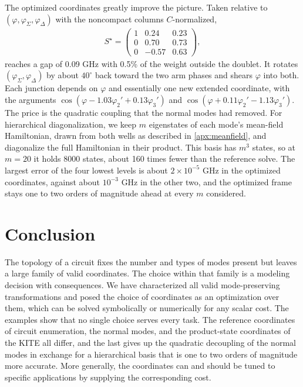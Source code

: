 The optimized coordinates greatly improve the picture.
Taken relative to $(\varphi,\varphi_\Sigma,\varphi_\Delta)$ with the noncompact columns $C$-normalized,
\begin{align}
S^\star=\begin{pmatrix}1&0.24&0.23\\0&0.70&0.73\\0&-0.57&0.63\end{pmatrix},
\label{eq:kite_S_opt}
\end{align}
reaches a gap of 0.09 GHz with 0.5\% of the weight outside the doublet.
It rotates $(\varphi_\Sigma,\varphi_\Delta)$ by about $40^\circ$ back toward the two arm phases and shears $\varphi$ into both.
Each junction depends on $\varphi$ and essentially one new extended coordinate, with the arguments $\cos(\varphi-1.03\varphi_2'+0.13\varphi_3')$ and $\cos(\varphi+0.11\varphi_2'-1.13\varphi_3')$.
The price is the quadratic coupling that the normal modes had removed.
For hierarchical diagonalization, we keep $m$ eigenstates of each mode's mean-field Hamiltonian, drawn from both wells as described in \cref{apx:meanfield}, and diagonalize the full Hamiltonian in their product.
This basis has $m^3$ states, so at $m=20$ it holds 8000 states, about 160 times fewer than the reference solve.
The largest error of the four lowest levels is about $2\times10^{-5}$ GHz in the optimized coordinates, against about $10^{-3}$ GHz in the other two, and the optimized frame stays one to two orders of magnitude ahead at every $m$ considered.

\section{Conclusion}\label{sec:conc}

The topology of a circuit fixes the number and types of modes present but leaves a large family of valid coordinates.
The choice within that family is a modeling decision with consequences.
We have characterized all valid mode-preserving transformations and posed the choice of coordinates as an optimization over them, which can be solved symbolically or numerically for any scalar cost.
The examples show that no single choice serves every task.
The reference coordinates of circuit enumeration, the normal modes, and the product-state coordinates of the KITE all differ, and the last gives up the quadratic decoupling of the normal modes in exchange for a hierarchical basis that is one to two orders of magnitude more accurate.
More generally, the coordinates can and should be tuned to specific applications by supplying the corresponding cost.

